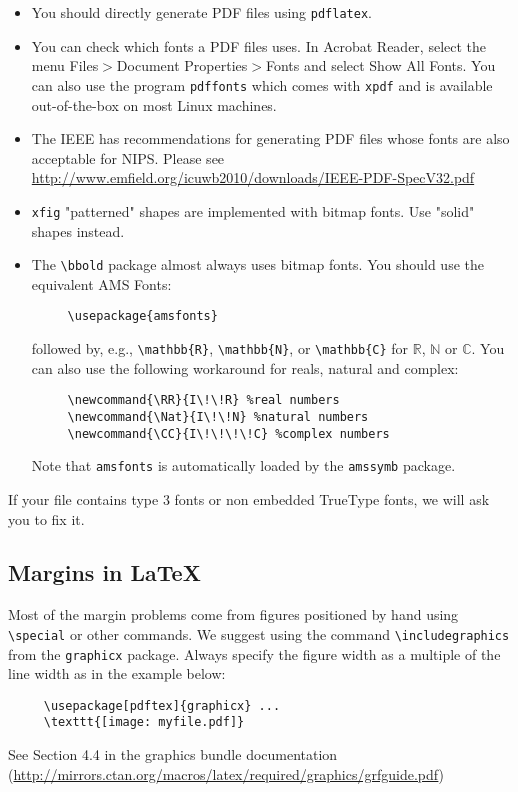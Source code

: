\documentclass{article}
\begin{document}
  \begin{itemize}
  
  \item You should directly generate PDF files using \verb+pdflatex+.
  
  \item You can check which fonts a PDF files uses.  In Acrobat Reader,
    select the menu Files$>$Document Properties$>$Fonts and select Show
    All Fonts. You can also use the program \verb+pdffonts+ which comes
    with \verb+xpdf+ and is available out-of-the-box on most Linux
    machines.
  
  \item The IEEE has recommendations for generating PDF files whose
    fonts are also acceptable for NIPS. Please see
    \url{http://www.emfield.org/icuwb2010/downloads/IEEE-PDF-SpecV32.pdf}
  
  \item \verb+xfig+ "patterned" shapes are implemented with bitmap
    fonts.  Use "solid" shapes instead.
  
  \item The \verb+\bbold+ package almost always uses bitmap fonts.  You
    should use the equivalent AMS Fonts:
  \begin{verbatim}
     \usepackage{amsfonts}
  \end{verbatim}
  followed by, e.g., \verb+\mathbb{R}+, \verb+\mathbb{N}+, or
  \verb+\mathbb{C}+ for $\mathbb{R}$, $\mathbb{N}$ or $\mathbb{C}$.  You
  can also use the following workaround for reals, natural and complex:
  \begin{verbatim}
     \newcommand{\RR}{I\!\!R} %real numbers
     \newcommand{\Nat}{I\!\!N} %natural numbers
     \newcommand{\CC}{I\!\!\!\!C} %complex numbers
  \end{verbatim}
  Note that \verb+amsfonts+ is automatically loaded by the
  \verb+amssymb+ package.
  
  \end{itemize}
  
  If your file contains type 3 fonts or non embedded TrueType fonts, we
  will ask you to fix it.
  
  \subsection{Margins in \LaTeX{}}
  
  Most of the margin problems come from figures positioned by hand using
  \verb+\special+ or other commands. We suggest using the command
  \verb+\includegraphics+ from the \verb+graphicx+ package. Always
  specify the figure width as a multiple of the line width as in the
  example below:
  \begin{verbatim}
     \usepackage[pdftex]{graphicx} ...
     \texttt{[image: myfile.pdf]}
  \end{verbatim}
  See Section 4.4 in the graphics bundle documentation
  (\url{http://mirrors.ctan.org/macros/latex/required/graphics/grfguide.pdf})
  
\end{document}

